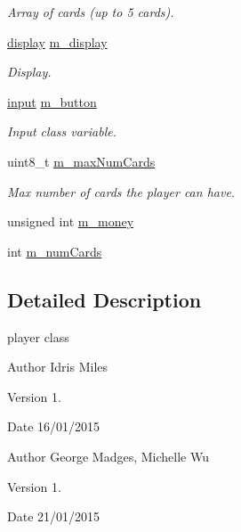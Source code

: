 \begin{DoxyCompactItemize}
\begin{DoxyCompactList}\small\item\em Array of cards (up to 5 cards). \end{DoxyCompactList}\item 
\hyperlink{classdisplay}{display} \hyperlink{classplayer_a2c9109b721f4eee6f13ae0f78954e1dd}{m\-\_\-display}
\begin{DoxyCompactList}\small\item\em Display. \end{DoxyCompactList}\item 
\hyperlink{classinput}{input} \hyperlink{classplayer_a0efa90b86bd8b5277ef349f3dc651782}{m\-\_\-button}
\begin{DoxyCompactList}\small\item\em Input class variable. \end{DoxyCompactList}\item 
uint8\-\_\-t \hyperlink{classplayer_a7d8f2e7568585a9129255cb6703ee233}{m\-\_\-max\-Num\-Cards}
\begin{DoxyCompactList}\small\item\em Max number of cards the player can have. \end{DoxyCompactList}\item 
unsigned int \hyperlink{classplayer_a8c0192ef483c0d137886b51fb8d1cc42}{m\-\_\-money}
\item 
int \hyperlink{classplayer_a6e99224ffd3657a51b56fbe24def6226}{m\-\_\-num\-Cards}
\end{DoxyCompactItemize}


\subsection{Detailed Description}
player class 

\begin{DoxyAuthor}{Author}
Idris Miles 
\end{DoxyAuthor}
\begin{DoxyVersion}{Version}
1. 
\end{DoxyVersion}
\begin{DoxyDate}{Date}
16/01/2015
\end{DoxyDate}
\begin{DoxyAuthor}{Author}
George Madges, Michelle Wu 
\end{DoxyAuthor}
\begin{DoxyVersion}{Version}
1. 
\end{DoxyVersion}
\begin{DoxyDate}{Date}
21/01/2015 
\end{DoxyDate}


